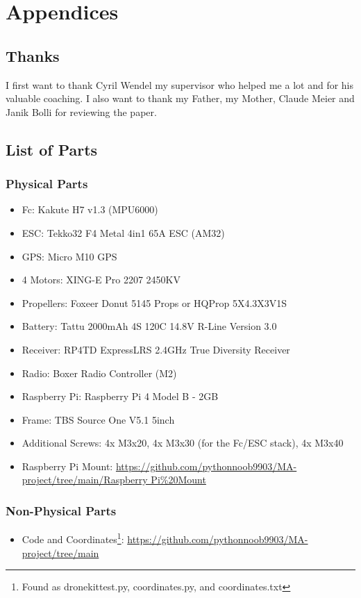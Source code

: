 \documentclass[svgnames]{article}
\begin{document}
	\section{Appendices}
	\subsection{Thanks}
	I first want to thank Cyril Wendel my supervisor who helped me a lot and for his valuable coaching. I also want to thank my Father, my Mother, Claude Meier and Janik Bolli for reviewing the paper.
	\printbibliography
	
	\newpage
	\listoffigures

	\newpage
	\printglossary[type=\acronymtype]
	\newpage
	\subsection{List of Parts}
	\subsubsection{Physical Parts}
	\begin{itemize}
		\item \gls{Fc}:		Kakute H7 v1.3 (MPU6000) \cite{KakuteH7}
		\item \gls{ESC}: 	Tekko32 F4 Metal 4in1 65A ESC (AM32) \cite{Tekko32}
		\item \gls{GPS}: 	Micro M10 GPS \cite{m10gps}
		\item 4 Motors: 	XING-E Pro 2207 2450KV \cite{xingepro}
		\item Propellers: 	Foxeer Donut 5145 Props \cite{toroidal} or HQProp 5X4.3X3V1S \cite{hqprops}
		\item Battery: 		Tattu 2000mAh 4S 120C 14.8V R-Line Version 3.0 \cite{tattu}
		\item Receiver: 	RP4TD ExpressLRS 2.4GHz True Diversity Receiver \cite{radiomasterreceiver}
		\item Radio: 		Boxer Radio Controller (M2) \cite{radiomasterboxer}
		\item Raspberry Pi:	Raspberry Pi 4 Model B - 2GB \cite{raspberrypi}
		\item Frame:		TBS Source One V5.1 5inch \cite{frame}
		\item Additional Screws: 4x M3x20, 4x M3x30 (for the \gls{Fc}/\gls{ESC} stack), 4x M3x40
		\item Raspberry Pi Mount: 	\url{https://github.com/pythonnoob9903/MA-project/tree/main/Raspberry Pi%20Mount}
	\end{itemize}
	\subsubsection{Non-Physical Parts}
	\begin{itemize}

		\item Code and Coordinates\footnote{Found as dronekittest.py, coordinates.py, and coordinates.txt}:  \url{https://github.com/pythonnoob9903/MA-project/tree/main}
	\end{itemize}
	
\end{document}
